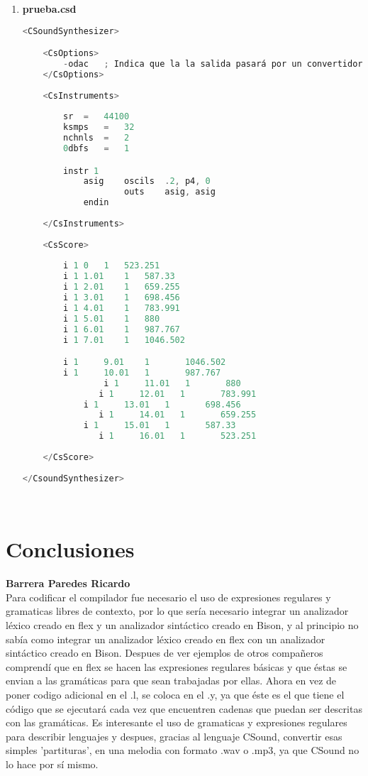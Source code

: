 \documentclass[12pt]{article}
\begin{document}
\begin{enumerate}
\begin{lstlisting}[language=C]
	return 0;
\end{lstlisting}\\

\item {\bf prueba.csd}\\
\begin{lstlisting}[language=C]
<CSoundSynthesizer>

	<CsOptions>
		-odac	; Indica que la la salida pasará por un convertidor Digital-Analógoco (DAC) y será reproducida
	</CsOptions>
	
	<CsInstruments>
	
		sr	=	44100
		ksmps	=	32
		nchnls	=	2
		0dbfs	=	1

		instr 1
			asig    oscils	.2, p4, 0
        			outs    asig, asig
	        endin
	
	</CsInstruments>
	
	<CsScore>
	
		i 1	0	1	523.251
		i 1	1.01	1	587.33
		i 1	2.01	1	659.255
		i 1	3.01	1	698.456
		i 1	4.01	1	783.991
		i 1	5.01	1	880
		i 1	6.01	1	987.767
		i 1	7.01	1	1046.502

		i 1     9.01    1       1046.502
		i 1     10.01   1       987.767
        		i 1     11.01   1       880
	           i 1     12.01   1       783.991
        	i 1     13.01   1       698.456
	           i 1     14.01   1       659.255
        	i 1     15.01   1       587.33
	           i 1     16.01   1       523.251
	
	</CsScore>
	
</CsoundSynthesizer>
\end{lstlisting}\\

\end{enumerate}


\section{Conclusiones}

{\bf Barrera Paredes Ricardo}\\
Para codificar el compilador fue necesario el uso de expresiones regulares y gramaticas libres de contexto, por lo que sería necesario integrar un analizador léxico creado en flex y un analizador sintáctico creado en Bison, y al principio no sabía como integrar un analizador léxico creado en flex con un analizador sintáctico creado en Bison. Despues de ver ejemplos de otros compañeros comprendí que en flex se hacen las expresiones regulares básicas y que éstas se envian a las gramáticas para que sean trabajadas por ellas. Ahora en vez de poner codigo adicional en el .l, se coloca en el .y, ya que éste es el que tiene el código que se ejecutará cada vez que encuentren cadenas que puedan ser descritas con las gramáticas. Es interesante el uso de gramaticas y expresiones regulares para describir lenguajes y despues, gracias al lenguaje CSound, convertir esas simples 'partituras', en una melodia con formato .wav o .mp3, ya que CSound no lo hace por sí mismo.
\end{document}
